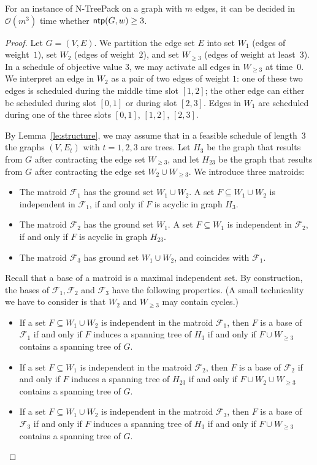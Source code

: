 \documentclass[runningheads]{llncs}
\newcommand{\bigO}{\mathcal{O}}
\newcommand{\xxxNTP}{{\sc N-TreePack}}
\DeclareMathOperator{\ntp}{\text{\sf ntp}}
\newcommand{\lasse}[1]{#1}
\begin{document}
\begin{theorem}
\label{th:value=3}
For an instance of {\xxxNTP} on a graph with $m$ edges, it can be decided in $\bigO(m^3)$ time 
whether $\ntp(G,w)\ge3$.
\end{theorem}
\begin{proof}
Let $G=(V,E)$. 
We partition the edge set $E$ into set $W_1$ (edges of weight~$1$), set $W_2$ (edges of weight~$2$),
and set $W_{\ge3}$ (edges of weight at least~$3$).
In a schedule of objective value $3$, we may activate all edges in $W_{\ge3}$ at time~$0$.
We interpret an edge in $W_2$ as a pair of two edges of weight $1$: one of these two edges is scheduled 
during the middle time slot $[1, 2]$; the other edge can either be scheduled during slot $[0,1]$ 
or during slot $[2,3]$. 
Edges in $W_1$ are scheduled during one of the three slots $[0,1]$, $[1,2]$, $[2,3]$.

By Lemma~\ref{le:structure}, we may assume that in a feasible schedule of length~$3$ the 
graphs $(V,E_t)$ with $t=1,2,3$ are trees.
Let $H_3$    be the graph that results from $G$ after contracting the edge set $W_{\ge3}$, and
let $H_{23}$ be the graph that results from $G$ after contracting the edge set $W_2\cup W_{\ge3}$.
We introduce three matroids:
\begin{itemize}
\item The matroid $\mathcal{F}_1$ has the ground set $W_1\cup W_2$. 
A set $F\subseteq W_1\cup W_2$ is independent in $\mathcal{F}_1$, if and only if $F$ is acyclic in graph $H_3$.
\item The matroid $\mathcal{F}_2$ has the ground set $W_1$.
A set $F\subseteq W_1$ is independent in $\mathcal{F}_2$, if and only if $F$ is acyclic in graph $H_{23}$.
\item The matroid $\mathcal{F}_3$ has ground set $W_1\cup W_2$, and coincides with $\mathcal{F}_1$.
\end{itemize}
\lasse{Recall that a base of a matroid is a maximal independent set. By construction, the bases of $\mathcal{F}_1, \mathcal{F}_2$ and $\mathcal{F}_3$ have the following properties. (A small technicality we have to consider is that $W_2$ and $W_{\geq3}$ may contain cycles.)}
\lasse{
\begin{itemize}
\item If a set $F \subseteq W_1 \cup W_2$ is independent in the matroid $\mathcal{F}_1$, then $F$ is a base of $\mathcal{F}_1$ if and only if $F$ induces a spanning tree of $H_3$ if and only if $F \cup W_{\geq 3}$ contains a spanning tree of $G$.
\item If a set $F \subseteq W_1$ is independent in the matroid $\mathcal{F}_2$, then $F$ is a base of $\mathcal{F}_2$ if and only if $F$ induces a spanning tree of $H_{23}$ if and only if $F \cup W_2 \cup W_{\geq 3}$ contains a spanning tree of $G$.
\item If a set $F \subseteq W_1 \cup W_2$ is independent in the matroid $\mathcal{F}_3$, then $F$ is a base of $\mathcal{F}_3$ if and only if $F$ induces a spanning tree of $H_3$ if and only if $F \cup W_{\geq 3}$ contains a spanning tree of $G$.
\end{itemize}
}


\end{proof}
\end{document}
